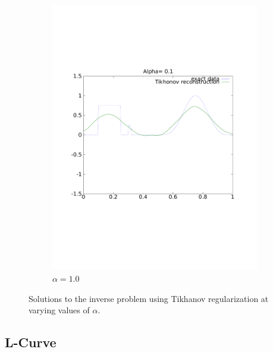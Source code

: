 \documentclass{article}
\begin{document}
\begin{figure}[!htb]
\begin{subfigure}[bh]{0.45\textwidth}
                \includegraphics[width=\textwidth]{plots/reconstruct1.pdf}
                \caption{$\alpha=1.0$}
        \end{subfigure}
        \caption{Solutions to the inverse problem using Tikhanov
 regularization at varying values of $\alpha$.} 
\end{figure}


\subsection{L-Curve}
\end{document}
